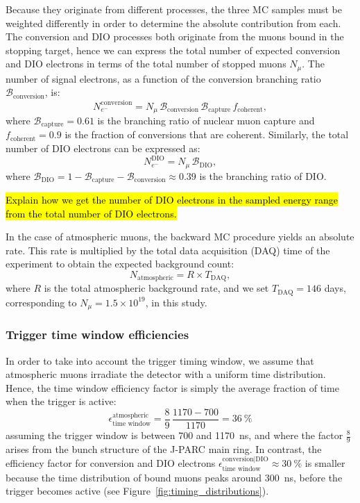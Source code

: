 Because they originate from different processes, the three MC samples must be
weighted differently in order to determine the absolute contribution from each.
The conversion and DIO processes both originate from the muons bound in the
stopping target, hence we can express the total number of expected conversion
and DIO electrons in terms of the total number of stopped muons $N_\mu$.
The number of signal electrons, as a function of the conversion branching
ratio $\mathcal{B}_\mathrm{conversion}$, is:
$$
N_{e^-}^\mathrm{conversion} = 
N_\mu \, \mathcal{B}_\mathrm{conversion} \, 
\mathcal{B}_\mathrm{capture} \, f_\mathrm{coherent},
$$
where $\mathcal{B}_\mathrm{capture} = 0.61$ is the branching ratio of nuclear
muon capture and $f_\mathrm{coherent}=0.9$ is the
fraction of conversions that are coherent. Similarly, the total number of DIO
electrons can be expressed as:
$$
N_{e^-}^\mathrm{DIO} = N_\mu \, \mathcal{B}_\mathrm{DIO},
$$
where $\mathcal{B}_\mathrm{DIO} = 1 - \mathcal{B}_\mathrm{capture} -
\mathcal{B}_\mathrm{conversion} \approx 0.39$ is the branching ratio of DIO.

\hl{ Explain how we get the number of DIO electrons in the sampled energy range
    from the total number of DIO electrons.}


In the case of atmospheric muons, the backward MC procedure yields an absolute
rate. This rate is multiplied by the total data acquisition (DAQ) time of the
experiment to obtain the expected background count:
$$
N_\mathrm{atmospheric} = R \times T_\mathrm{DAQ},
$$
where $R$ is the total atmospheric background rate, and we set
$T_\mathrm{DAQ}=146$ days, corresponding to $N_\mu = 1.5\times 10^{19}$, in this
study. 

\subsubsection{Trigger time window efficiencies}
In order to take into account the trigger timing window, we assume that
atmospheric muons irradiate the detector with a uniform time distribution.
Hence, the time window efficiency factor is simply the average fraction of
time when the trigger is active:
$$
\epsilon_\text{time window}^\mathrm{atmospheric} =
\frac{8}{9}\,\frac{1170 - 700}{1170} = \SI{36}{\percent}
$$
assuming the trigger window is between 700 and \SI{1170}{\ns}, and where the
factor $\frac{8}{9}$ arises from the bunch structure of the J-PARC main ring. In
contrast, the efficiency factor for conversion and DIO electrons
$\epsilon_\text{time window}^\text{conversion|DIO} \approx \SI{30}{\percent}$ is
smaller because the time distribution of bound muons peaks around \SI{300}{\ns},
before the trigger becomes active (see Figure~\ref{fig:timing_distributions}).


